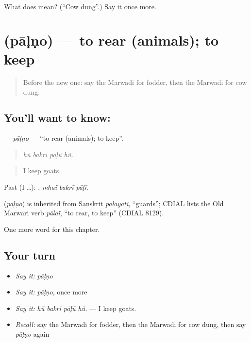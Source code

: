 \begin{tcolorbox}[breakable,colback=teal!4,colframe=teal!35!black,title={Before you move on}]
What does  mean? (\textquotedblleft{}Cow dung\textquotedblright{}.) Say it once more.
\end{tcolorbox}
\section[\texorpdfstring{\mw{पाळणो} (pāḷṇo)}{पाळणो (pāḷṇo)}]{ (pāḷṇo) — to rear (animals); to keep}

\label{lesson:MW-C235-palno}



\begin{quote}
Before the new one: say the Marwadi for fodder, then the Marwadi for cow dung.
\end{quote}

\subsection*{You'll want to know: }
\textbf{} — \emph{pāḷṇo} — \textquotedblleft{}to rear (animals); to keep\textquotedblright{}.

\begin{quote}
   
\end{quote}

\begin{quote}
\emph{hū̃ bakrī pāḷū̃ hū̃.}
\end{quote}

\begin{quote}
I keep goats.
\end{quote}

Past (I …):   , \emph{mhaĩ bakrī pāḷī}.

\begin{cousinweb}
\textbf{} (\emph{pāḷṇo}) is inherited from Sanskrit \emph{pālayati}, \textquotedblleft{}guards\textquotedblright{}; CDIAL lists the Old Marwari verb \emph{pālaï}, \textquotedblleft{}to rear, to keep\textquotedblright{} (CDIAL 8129).
\end{cousinweb}

\begin{grammarlens}[title={What you've built}]
One more word for this chapter.
\end{grammarlens}

\subsection*{Your turn}
\begin{itemize}
\raggedright
  \item \emph{Say it:} \emph{pāḷṇo}
  \item \emph{Say it:} \emph{pāḷṇo}, once more
  \item \emph{Say it:} \emph{hū̃ bakrī pāḷū̃ hū̃.} — I keep goats.
  \item \emph{Recall:} say the Marwadi for fodder, then the Marwadi for cow dung, then say \emph{pāḷṇo} again
\end{itemize}

